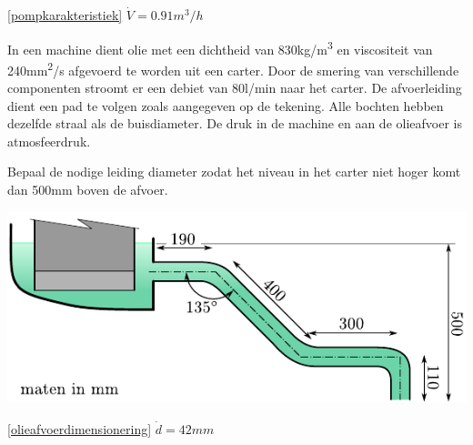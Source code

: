 \begin{antwoord}{\ref{pompkarakteristiek}}
	$\dot{V} = 0.91\unit{m^3/h}$
\end{antwoord}
\begin{toepassing}[*]
	\label{olieafvoerdimensionering}
In een machine dient olie met een dichtheid van 830\unit{kg/m^3} en viscositeit van 240\unit{mm^2/s} afgevoerd te worden uit een carter. Door de smering van verschillende componenten stroomt er een debiet van 80l/min naar het carter. De afvoerleiding dient een pad te volgen zoals aangegeven op de tekening. Alle bochten hebben dezelfde straal als de buisdiameter. De druk in de machine en aan de olieafvoer is atmosfeerdruk.
	
Bepaal de nodige leiding diameter zodat het niveau in het carter niet hoger komt dan 500mm boven de afvoer.

	\centering
	\includegraphics{fig/stroming_in_leidingen/olieafvoerdimensionering}
\end{toepassing}
\begin{antwoord}{\ref{olieafvoerdimensionering}}
	$\dot{d} = 42\unit{mm}$
\end{antwoord}
